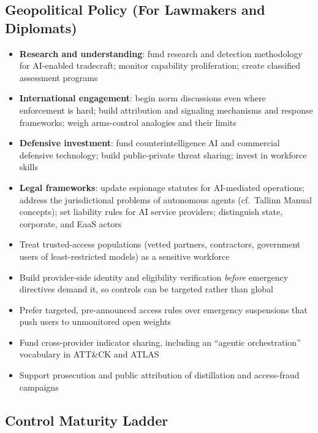 \documentclass[11pt,letterpaper]{article}
\begin{document}
\subsection{Geopolitical Policy (For Lawmakers and Diplomats)}

\begin{itemize}
  \item \textbf{Research and understanding}: fund research and detection methodology for AI-enabled tradecraft; monitor capability proliferation; create classified assessment programs
  \item \textbf{International engagement}: begin norm discussions even where enforcement is hard; build attribution and signaling mechanisms and response frameworks; weigh arms-control analogies and their limits
  \item \textbf{Defensive investment}: fund counterintelligence AI and commercial defensive technology; build public-private threat sharing; invest in workforce skills
  \item \textbf{Legal frameworks}: update espionage statutes for AI-mediated operations; address the jurisdictional problems of autonomous agents (cf.\ Tallinn Manual concepts); set liability rules for AI service providers; distinguish state, corporate, and EaaS actors
\end{itemize}

\begin{recbox}
\begin{itemize}
  \item Treat trusted-access populations (vetted partners, contractors, government users of least-restricted models) as a sensitive workforce
  \item Build provider-side identity and eligibility verification \textit{before} emergency directives demand it, so controls can be targeted rather than global
  \item Prefer targeted, pre-announced access rules over emergency suspensions that push users to unmonitored open weights
  \item Fund cross-provider indicator sharing, including an ``agentic orchestration'' vocabulary in ATT\&CK and ATLAS
  \item Support prosecution and public attribution of distillation and access-fraud campaigns
\end{itemize}
\end{recbox}

\subsection{Control Maturity Ladder}
\end{document}
